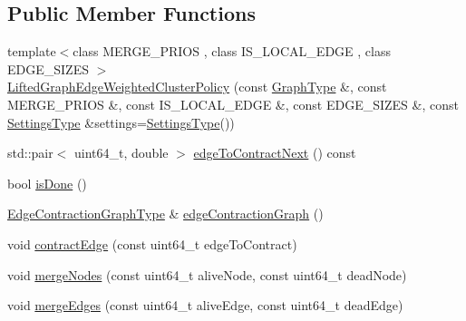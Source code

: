 \subsection*{Public Member Functions}
\begin{DoxyCompactItemize}
\item 
{\footnotesize template$<$class M\+E\+R\+G\+E\+\_\+\+P\+R\+I\+OS , class I\+S\+\_\+\+L\+O\+C\+A\+L\+\_\+\+E\+D\+GE , class E\+D\+G\+E\+\_\+\+S\+I\+Z\+ES $>$ }\\\hyperlink{classnifty_1_1graph_1_1agglo_1_1LiftedGraphEdgeWeightedClusterPolicy_a8380b58dc9e7c5b772af56a620c7946b}{Lifted\+Graph\+Edge\+Weighted\+Cluster\+Policy} (const \hyperlink{classnifty_1_1graph_1_1agglo_1_1LiftedGraphEdgeWeightedClusterPolicy_a09555efd4d9896f60e2225f905a6600c}{Graph\+Type} \&, const M\+E\+R\+G\+E\+\_\+\+P\+R\+I\+OS \&, const I\+S\+\_\+\+L\+O\+C\+A\+L\+\_\+\+E\+D\+GE \&, const E\+D\+G\+E\+\_\+\+S\+I\+Z\+ES \&, const \hyperlink{structnifty_1_1graph_1_1agglo_1_1LiftedGraphEdgeWeightedClusterPolicy_1_1SettingsType}{Settings\+Type} \&settings=\hyperlink{structnifty_1_1graph_1_1agglo_1_1LiftedGraphEdgeWeightedClusterPolicy_1_1SettingsType}{Settings\+Type}())
\item 
std\+::pair$<$ uint64\+\_\+t, double $>$ \hyperlink{classnifty_1_1graph_1_1agglo_1_1LiftedGraphEdgeWeightedClusterPolicy_ac6a70e6487e7d40638f463be143b2fb0}{edge\+To\+Contract\+Next} () const
\item 
bool \hyperlink{classnifty_1_1graph_1_1agglo_1_1LiftedGraphEdgeWeightedClusterPolicy_ade41a75987866ee0f747f629e8be1f8a}{is\+Done} ()
\item 
\hyperlink{classnifty_1_1graph_1_1agglo_1_1LiftedGraphEdgeWeightedClusterPolicy_a20c8dc11217be76cda874a9ef9720e92}{Edge\+Contraction\+Graph\+Type} \& \hyperlink{classnifty_1_1graph_1_1agglo_1_1LiftedGraphEdgeWeightedClusterPolicy_a95287f99bc3b86ccbed7dcd9c8851628}{edge\+Contraction\+Graph} ()
\item 
void \hyperlink{classnifty_1_1graph_1_1agglo_1_1LiftedGraphEdgeWeightedClusterPolicy_a56bc42922fcf00d486cfebca957c18ab}{contract\+Edge} (const uint64\+\_\+t edge\+To\+Contract)
\item 
void \hyperlink{classnifty_1_1graph_1_1agglo_1_1LiftedGraphEdgeWeightedClusterPolicy_a0a8e7d91a8393b6c9d350bc69305bedf}{merge\+Nodes} (const uint64\+\_\+t alive\+Node, const uint64\+\_\+t dead\+Node)
\item 
void \hyperlink{classnifty_1_1graph_1_1agglo_1_1LiftedGraphEdgeWeightedClusterPolicy_a033e17251eb1e313f930a53a3c73a002}{merge\+Edges} (const uint64\+\_\+t alive\+Edge, const uint64\+\_\+t dead\+Edge)

\end{DoxyCompactItemize}
